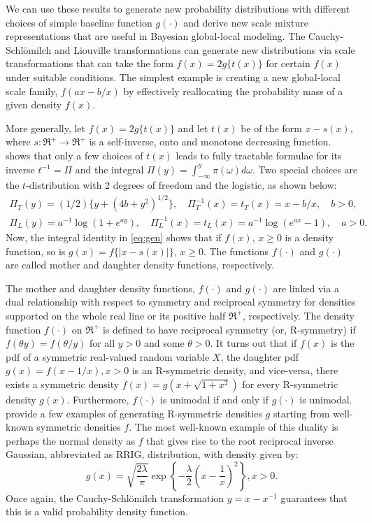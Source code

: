 \documentclass[ECP]{ejpecp} %
\def\CS{Cauchy-Schl\"omilch}
\begin{document}
We can use these results to generate new probability distributions with different choices of simple baseline function $g(\cdot)$ and derive new scale mixture representations that are useful in Bayesian global-local modeling. The \CS{} and Liouville transformations can generate new distributions via scale transformations that can take the form $f(x) = 2 g\{ t(x) \}$ for certain $f(x)$ under suitable conditions. The simplest example is creating a new global-local scale family, $f(a x - b/x)$ by effectively reallocating the probability mass of a given density $f(x)$. 

More generally, let $f(x) = 2g\{ t(x) \}$ and let $t(x)$ be of the form $x-s(x)$, where $s : \Re^+ \to \Re^+$ is a self-inverse, onto and monotone decreasing function.    \cite{jones_generating_2014} shows that only a few choices of $t(x)$ leads to fully tractable formulae for its inverse $t^{-1}= \Pi$ and the integral 
$\Pi(y) = \int_{-\infty}^{y} \pi(\omega) d\omega$. Two special choices are the $t$-distribution with 2 degrees of freedom and the logistic, as shown below:
\begin{align*}
\Pi_{T}(y) = (1/2)\{ y+(4b+y^2)^{1/2}\}, \quad \Pi_T^{-1}(x) = t_T(x) = x - b/x, \quad b >0,\\
\Pi_{L}(y) = a^{-1} \log(1+e^{ay}), \quad \Pi_L^{-1}(x) = t_L(x) = a^{-1} \log(e^{ax}-1), \quad a>0.
\end{align*}
Now, the integral identity in \eqref{eq:gen} shows that if $f(x)$, $x \geq 0$ is a density function, so is $g(x) = f\{\lvert x-s(x) \rvert\}$, $x \ge 0$.  The functions $f(\cdot)$ and $g(\cdot)$ are called mother and daughter density functions, respectively.  %

The mother and daughter density functions, $f(\cdot)$ and $g(\cdot)$ are linked via a dual relationship with respect to symmetry and reciprocal symmetry for densities supported on the whole real line or its positive half $\Re^{+}$, respectively. The density function $f(\cdot)$ on $\Re^{+}$ is defined to have reciprocal symmetry (or, R-symmetry) if $f(\theta y) = f(\theta / y)$ for all $y > 0$ and some $\theta >0$. It turns out that if $f(x)$ is the pdf of a symmetric real-valued random variable $X$, the daughter pdf $g(x) = f(x-1/x), x>0$ is an R-symmetric density, and vice-versa, there exists a symmetric density $f(x) = g(x+\sqrt{1+x^2})$ for
every R-symmetric density $g(x)$. Furthermore, $f(\cdot)$ is unimodal if and only if $g(\cdot)$ is unimodal. \cite{chaubey2010reciprocal} provide a few examples of generating R-symmetric densities $g$ starting from well-known symmetric densities $f$. The most well-known example of this duality is perhaps the normal density as $f$ that gives rise to the root reciprocal inverse Gaussian, abbreviated as RRIG, distribution, with density given by: 
\[
g(x) = \sqrt{\frac{2\lambda}{\pi}} \exp \left\{ - \frac{\lambda}{2} \left( x - \frac{1}{x} \right)^2 \right\}, x >0.  
\]
Once again, the \CS{} transformation $y = x - x^{-1}$ guarantees that this is a valid probability density function.
\end{document}

